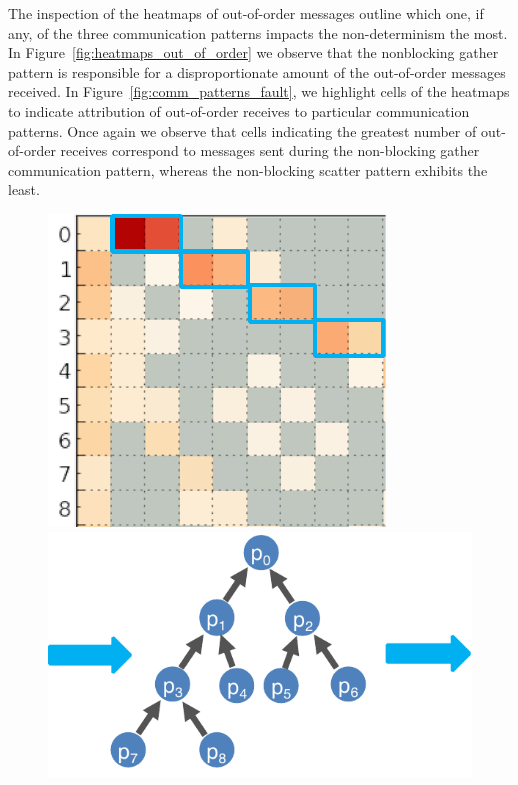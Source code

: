 The inspection of the heatmaps of out-of-order messages outline which
one, if any, of the three communication patterns impacts the
non-determinism the most. In Figure~\ref{fig:heatmaps_out_of_order} we
observe that the nonblocking gather pattern is responsible for a
disproportionate amount of the out-of-order messages received. In
Figure~\ref{fig:comm_patterns_fault}, we highlight cells of the
heatmaps to indicate attribution of out-of-order receives to
particular communication patterns. Once again we observe that cells
indicating the greatest number of out-of-order receives correspond to
messages sent during the non-blocking gather communication pattern,
whereas the non-blocking scatter pattern exhibits the least.
\begin{figure}
    \centering
    \begin{minipage}[b]{0.33\linewidth}
        \centering
        \includegraphics[width=0.9\linewidth]{chapter_4_figures/partial_heatmap_total_gather}
    \end{minipage}%
    \begin{minipage}[b]{0.33\linewidth}
        \centering
        \includegraphics[width=\linewidth]{chapter_4_figures/comm_pattern_gather}

\end{minipage}
\end{figure}
